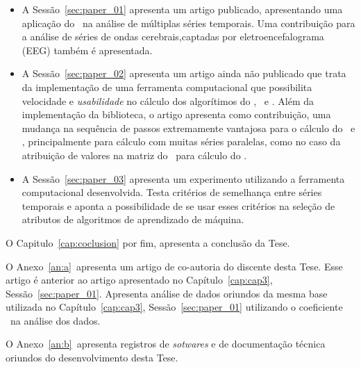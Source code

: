 \begin{itemize}

\item A Sessão~\ref{sec:paper_01} apresenta um artigo publicado, apresentando uma aplicação do \dmc~na análise de múltiplas séries temporais. Uma contribuição para a análise de séries de ondas cerebrais,captadas por eletroencefalograma (EEG) também é apresentada.

\item A Sessão~\ref{sec:paper_02} apresenta um artigo ainda não publicado que trata da implementação de uma ferramenta computacional que possibilita velocidade e \emph{usabilidade} no cálculo dos algorítimos do \dfa, \dcca~e \pdcca. Além da implementação da biblioteca, o artigo apresenta como contribuição, uma mudança na sequência de passos extremamente vantajosa para o cálculo do \dcca~e \pdcca, principalmente para cálculo com muitas séries paralelas, como no caso da atribuição de valores na matriz do \pdcca~para cálculo do \dmc.

\item A Sessão~\ref{sec:paper_03} apresenta um experimento utilizando a ferramenta computacional desenvolvida. Testa critérios de semelhança entre séries temporais e aponta a possibilidade de se usar esses critérios na seleção de atributos de algoritmos de aprendizado de máquina.

\end{itemize}

O Capitulo~\ref{cap:coclusion} por fim, apresenta a conclusão da Tese.

O Anexo~\ref{an:a}~apresenta um artigo de co-autoria do discente desta Tese. Esse artigo é anterior ao artigo apresentado no Capítulo~\ref{cap:cap3}, Sessão~\ref{sec:paper_01}. Apresenta análise de dados oriundos da mesma base utilizada no Capítulo~\ref{cap:cap3}, Sessão~\ref{sec:paper_01} utilizando o coeficiente \pdcca~na análise dos dados.

O Anexo~\ref{an:b}~apresenta registros de \emph{sotwares} e de documentação técnica oriundos do desenvolvimento desta Tese.


